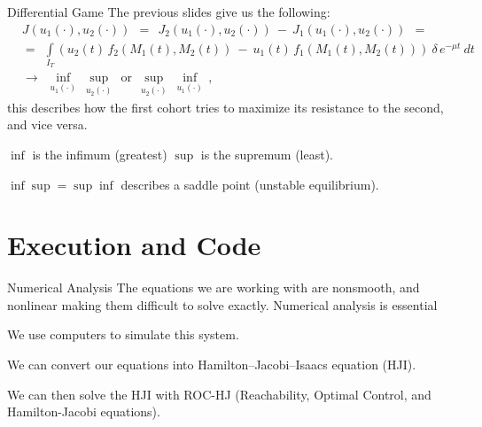 \documentclass{beamer}
\begin{document}
\begin{frame}{Differential Game}
    The previous slides give us the following:
    $$
    \begin{aligned}
    & J(u_1(\cdot), u_2(\cdot)) \:\: = \:\: J_2(u_1(\cdot), u_2(\cdot)) \: - \: J_1(u_1(\cdot), u_2(\cdot)) \:\: = \\
    & = \:\: \int\limits_{I_T} (u_2(t) \, f_2(M_1(t), M_2(t)) \: - \: u_1(t) \, f_1(M_1(t), M_2(t))) \: \delta \, e^{-\mu t} \: dt \:\:
    \\& \longrightarrow \:\: \inf_{u_1(\cdot)} \: \sup_{u_2(\cdot)} \:\: \mbox{or} \:\:
    \sup_{u_2(\cdot)} \: \inf_{u_1(\cdot)} \, ,
    \end{aligned}
    $$ 
    this describes how the first cohort tries to maximize its resistance to the second, and vice versa.\newline
    
    $\inf$ is the infimum (greatest) $\sup$ is the supremum (least).\newline
    
    $\inf\sup=\sup\inf$ describes a saddle point (unstable equilibrium).
    
\end{frame}

\section{Execution and Code}
\begin{frame}{Numerical Analysis}
    The equations we are working with are nonsmooth, and nonlinear making them difficult to solve exactly. Numerical analysis is essential \newline

    We use computers to simulate this system. \newline
    
    We can convert our equations into Hamilton--Jacobi--Isaacs equation (HJI). \newline
    
    We can then solve the HJI with ROC-HJ (Reachability, Optimal Control, and Hamilton-Jacobi equations).
\end{frame}
\end{document}

